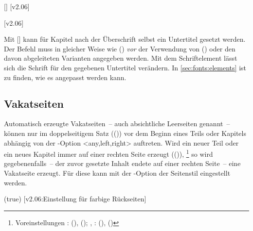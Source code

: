 \begin{DeclareEntity*}{}
\begin{DeclareEntity*}{}
\begin{DeclareEntity*}{}
\begin{Declaration}
  {[]}
  [v2.06]
\begin{Declaration}
  {}
  [v2.06]
\printdeclarationlist[Schriftelemente]

Mit [] kann für Kapitel nach der 
Überschrift selbst ein Untertitel gesetzt werden. Der Befehl muss in gleicher 
Weise wie () \emph{vor} der 
Verwendung von () oder den davon 
abgeleiteten Varianten angegeben werden. Mit dem Schriftelement 
 lässt sich die Schrift für den gegebenen Untertitel 
verändern. In \autoref{sec:fonts:elements} ist zu finden, wie es angepasst 
werden kann.
\end{Declaration}
\end{Declaration}
%
%



\subsection{%
  Vakatseiten%
  \label{sec:vacat}%
}

Automatisch erzeugte Vakatseiten~-- auch absichtliche Leerseiten genannt~-- 
können nur im doppelseitigem Satz (()) 
vor dem Beginn eines Teils oder Kapitels abhängig von der \KOMAScript-Option 
<any,left,right> 
auftreten. Wird ein neuer Teil oder ein neues Kapitel immer auf einer rechten 
Seite erzeugt (()),%
\footnote{%
  Voreinstellungen
  : 
  (), 
  ();
  , : 
  (), 
  ()%
}
so wird gegebenenfalls~-- der zuvor gesetzte Inhalt endete auf einer rechten 
Seite~-- eine Vakatseite erzeugt. Für diese kann mit der \KOMAScript-Option 
 der 
Seitenstil eingestellt werden.

\begin{Declaration}
  {}
  (true)
  [v2.06:Einstellung für farbige Rückseiten]


\end{Declaration}
\end{DeclareEntity*}
\end{DeclareEntity*}
\end{DeclareEntity*}
